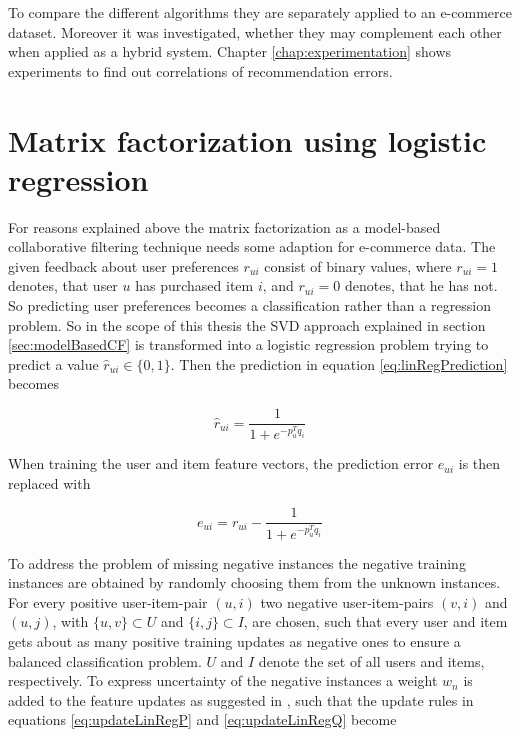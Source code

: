 \documentclass[10pt]{reportMaster}
\begin{document}
To compare the different algorithms they are separately applied to an e-commerce dataset.
Moreover it was investigated, whether they may complement each other when applied as a hybrid system.
Chapter \ref{chap:experimentation} shows experiments to find out correlations of recommendation errors.


\section{Matrix factorization using logistic regression}
\label{sec:logRegSVD}

For reasons explained above the matrix factorization as a model-based collaborative filtering technique needs some adaption for e-commerce data.
The given feedback about user preferences $r_{ui}$ consist of binary values, where $r_{ui} = 1$ denotes, that user $u$ has purchased item $i$, and $r_{ui} = 0$ denotes, that he has not.
So predicting user preferences becomes a classification rather than a regression problem.
So in the scope of this thesis the SVD approach explained in section \ref{sec:modelBasedCF} is transformed into a logistic regression problem trying to predict a value $\hat{r}_{ui} \in \{0,1\}$.
Then the prediction in equation \ref{eq:linRegPrediction} becomes 

\begin{equation}
	\hat{r}_{ui} = \frac{1}{1 + e^{-p_u^Tq_i}}
\end{equation}

When training the user and item feature vectors, the prediction error $e_{ui}$ is then replaced with 

\begin{equation}
	e_{ui} = r_{ui} - \frac{1}{1 + e^{-p_u^Tq_i}}
\end{equation}


To address the problem of missing negative instances the negative training instances are obtained by randomly choosing them from the unknown instances.
For every positive user-item-pair $(u, i)$ two negative user-item-pairs $(v, i)$ and $(u,j)$, with $\{u, v\} \subset U$ and $\{i, j\} \subset I$, are chosen, such that every user and item gets about as many positive training updates as negative ones to ensure a balanced classification problem.
$U$ and $I$ denote the set of all users and items, respectively.
To express uncertainty of the negative instances a weight $w_n$ is added to the feature updates as suggested in \cite{occf}, such that the update rules in equations \ref{eq:updateLinRegP} and \ref{eq:updateLinRegQ} become 
\end{document}
